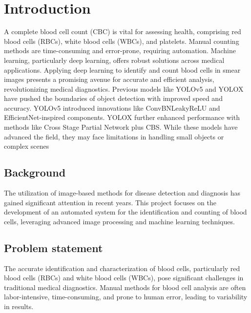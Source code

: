 \chapter{Introduction}
\label{ch:into} %

A complete blood cell count (CBC) is vital for assessing health, comprising red blood cells 
(RBCs), white blood cells (WBCs), and platelets. Manual counting methods are time-consuming and 
error-prone, requiring automation. Machine learning, particularly deep learning, offers robust 
solutions across medical applications. Applying deep learning to identify and count blood cells 
in smear images presents a promising avenue for accurate and efficient analysis, 
revolutionizing medical diagnostics. Previous models like YOLOv5 and YOLOX have pushed the 
boundaries of object detection with improved speed and accuracy. YOLOv5 introduced innovations 
like ConvBNLeakyReLU and EfficientNet-inspired components. YOLOX further enhanced performance 
with methods like Cross Stage Partial Network plus CBS. While these models have advanced the 
field, they may face limitations in handling small objects or complex scenes
       

\section{Background}
\label{sec:into_back}
The utilization of image-based methods for disease detection and diagnosis has gained 
significant attention in recent years. This project focuses on the development of an automated 
system for the identification and counting of blood cells, leveraging advanced image processing 
and machine learning techniques.

\section{Problem statement}
\label{sec:intro_prob_art}
The accurate identification and characterization of blood cells, particularly red blood cells 
(RBCs) and white blood cells (WBCs), pose significant challenges in traditional medical 
diagnostics. Manual methods for blood cell analysis are often labor-intensive, time-consuming, 
and prone to human error, leading to variability in results.
